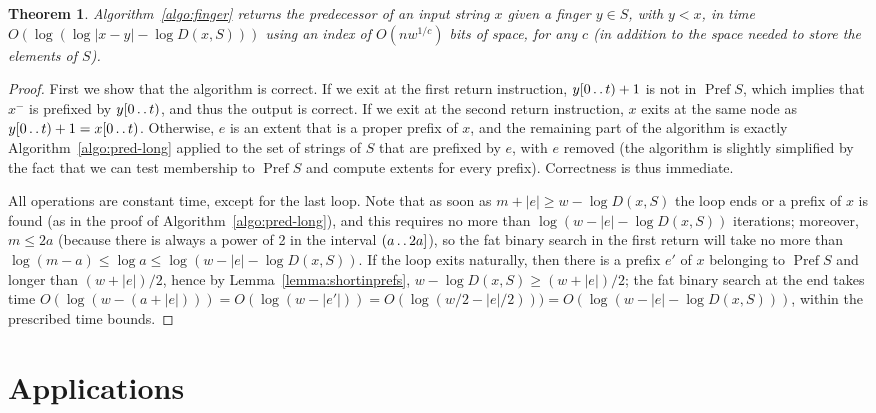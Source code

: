 \documentclass[a4paper,11pt]{article}
\newtheorem{theorem}{Theorem}[section]
\newcommand{\?}{\mskip1.5mu}
\def\..{\,\mathpunct{\ldotp\ldotp}} %
\DeclareMathOperator{\Pref}{Pref}
\begin{document}
\begin{theorem}
\label{th:finger}
Algorithm~\ref{algo:finger} returns the predecessor of an input string $x$ given
a finger $y\in S$, with $y<x$, in time $O(\log(\log|x-y|-\log D(x,S)))$ using an 
index of $O(n w^{1/c})$ bits 
of space, for any $c$ (in addition to the space needed to store the elements of $S$).
\end{theorem}
\begin{proof}
First we show that the algorithm is correct. 
If we exit at the first return instruction, $y[0\..t)+1$ is
not in $\Pref S$, which implies that $x^-$ is prefixed by $y[0\..t)$, and thus
the output is correct. If we exit at the second return instruction, $x$
exits at the same node as $y[0\..t)+1=x[0\..t)$. Otherwise, $e$ is an extent
that is a proper prefix of $x$, and the remaining part of the algorithm
is exactly Algorithm~\ref{algo:pred-long} applied to the set of strings of $S$ 
that are prefixed by $e$, with $e$ removed (the algorithm is slightly
simplified by the fact that we can test membership to $\Pref S$ and compute
extents for every prefix). Correctness is thus immediate.

All operations are constant time, except for the last loop. Note that as soon as
$m+|e|\geq w-\log D(x,S)$ the loop ends or a prefix of $x$ is found (as in the
proof of Algorithm~\ref{algo:pred-long}), and this requires no more than $\log(w-|e|-\log
D(x,S))$ iterations; moreover, $m\leq 2a$ (because there is always
a power of 2 in the interval $(a\..2a]$), so the fat binary search in the first
return will take no more than $\log(m-a)\leq \log a\leq \log (w-|e|-\log D(x,S))$.
If the loop exits naturally, then there is a prefix $e'$ of $x$ belonging
to $\Pref S$ and longer than $(w+|e|)/2$, hence by
Lemma~\ref{lemma:shortinprefs}, $w-\log D(x,S)\geq (w+|e|)/2$; the fat binary search at the
end takes time $O(\log (w-(a+|e|)))=O(\log (w-|e'|))=O(\log( w/2 -
|e|/2)))=O(\log(w-|e|-\log D(x,S)))$, within the prescribed time bounds.
\end{proof}

\section{Applications}
\end{document}
